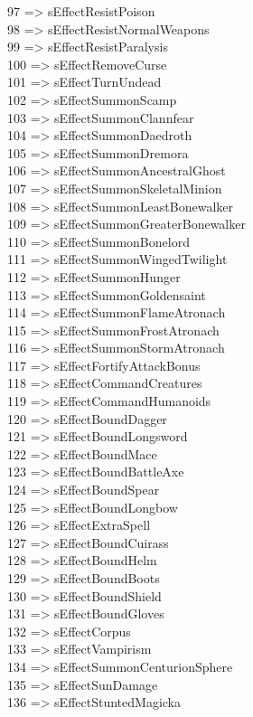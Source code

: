 \documentclass[
]{article}
\begin{document}
97 =\textgreater{} sEffectResistPoison\\
98 =\textgreater{} sEffectResistNormalWeapons\\
99 =\textgreater{} sEffectResistParalysis\\
100 =\textgreater{} sEffectRemoveCurse\\
101 =\textgreater{} sEffectTurnUndead\\
102 =\textgreater{} sEffectSummonScamp\\
103 =\textgreater{} sEffectSummonClannfear\\
104 =\textgreater{} sEffectSummonDaedroth\\
105 =\textgreater{} sEffectSummonDremora\\
106 =\textgreater{} sEffectSummonAncestralGhost\\
107 =\textgreater{} sEffectSummonSkeletalMinion\\
108 =\textgreater{} sEffectSummonLeastBonewalker\\
109 =\textgreater{} sEffectSummonGreaterBonewalker\\
110 =\textgreater{} sEffectSummonBonelord\\
111 =\textgreater{} sEffectSummonWingedTwilight\\
112 =\textgreater{} sEffectSummonHunger\\
113 =\textgreater{} sEffectSummonGoldensaint\\
114 =\textgreater{} sEffectSummonFlameAtronach\\
115 =\textgreater{} sEffectSummonFrostAtronach\\
116 =\textgreater{} sEffectSummonStormAtronach\\
117 =\textgreater{} sEffectFortifyAttackBonus\\
118 =\textgreater{} sEffectCommandCreatures\\
119 =\textgreater{} sEffectCommandHumanoids\\
120 =\textgreater{} sEffectBoundDagger\\
121 =\textgreater{} sEffectBoundLongsword\\
122 =\textgreater{} sEffectBoundMace\\
123 =\textgreater{} sEffectBoundBattleAxe\\
124 =\textgreater{} sEffectBoundSpear\\
125 =\textgreater{} sEffectBoundLongbow\\
126 =\textgreater{} sEffectExtraSpell\\
127 =\textgreater{} sEffectBoundCuirass\\
128 =\textgreater{} sEffectBoundHelm\\
129 =\textgreater{} sEffectBoundBoots\\
130 =\textgreater{} sEffectBoundShield\\
131 =\textgreater{} sEffectBoundGloves\\
132 =\textgreater{} sEffectCorpus\\
133 =\textgreater{} sEffectVampirism\\
134 =\textgreater{} sEffectSummonCenturionSphere\\
135 =\textgreater{} sEffectSunDamage\\
136 =\textgreater{} sEffectStuntedMagicka
\end{document}
